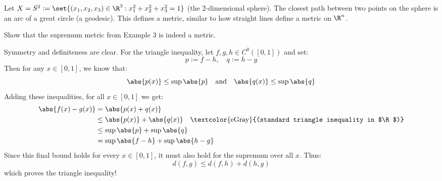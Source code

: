 \begin{example*}
Let $X = S^2 := \set{ (x_1, x_2, x_3) \in \R^3 : x_1^2 + x_2^2 + x_3^2 = 1 }$ (the 2-dimensional sphere). 
The closest path between two points on the sphere is an arc of a great circle (a geodesic). This defines a metric, similar to how straight lines define a metric on $\R^n$.

\begin{center}
\end{center}
\end{example*}

\hrulefill
\vspace{0.5cm}

\begin{exercise*}
Show that the supremum metric from Example 3 is indeed a metric.
\end{exercise*}

\begin{solution}
Symmetry and definiteness are clear. For the triangle inequality, let $f, g, h \in C^0([0,1])$ and set:
\[ p := f - h, \quad q := h - g \]
Then for any $x \in [0,1]$, we know that:
\[ \abs{p(x)} \le \sup \abs{p} \quad \text{and} \quad \abs{q(x)} \le \sup \abs{q} \]
Adding these inequalities, for all $x \in [0,1]$ we get:
\begin{equation}
    \begin{aligned}
        \abs{f(x) - g(x)} &= \abs{p(x) + q(x)} \\
        &\le \abs{p(x)} + \abs{q(x)} \quad \text{\textcolor{eGray}{(standard triangle inequality in $\R$)}} \\
        &\le \sup \abs{p} + \sup \abs{q} \\
        &= \sup \abs{f - h} + \sup \abs{h - g}
    \end{aligned}
\end{equation}
Since this final bound holds for \textcolor{eSaddleBrown}{every} $x \in [0,1]$, it must also hold for the supremum over all $x$. Thus:
\[ d(f,g) \le d(f,h) + d(h,g) \]
which proves the triangle inequality!
\end{solution}
